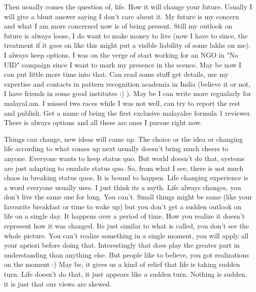 Then usually comes the question of, life. How it will change your future. Usually I will give a 
blunt answer saying I don't care about it. My future is my concern and what I am more concerned now 
is of being present. Still my outlook on future is always loose, I do want to make money to live (now 
I have to since, the treatment if it goes on like this might put a visible liability of some lakhs 
on me). I always keep options, I was on the verge of start working for an NGO in "No UID" campaign 
since I want to mark my presence in the scence. May be now I can put little more time into that. Can 
read some stuff get details, use my expertise and contacts in pattern recognition academia in India
(believe it or not, I have friends in some good institutes :) ). May be I can write more regualarly 
for malayal.am. I missed two races while I was not well, can try to report the rest and publish. 
Get a name of being the first exclusive malayalee formula 1 reviewer. There is always options and 
all these are ones I pursue right now. 

Things can change, new ideas will come up. The choice or the idea or changing life according to 
what comes up next usually doesn't bring much cheers to anyone. Everyone wants to keep status quo. 
But world doesn't do that, systems are just adapting to emulate status quo. So, from what I see, 
there is not much chaos in breaking status quos. It is bound to happen. Life changing experience is 
a word everyone usually uses. I just think its a myth. Life always changes, you don't live the same 
one for long. You can't. Small things might be same (like your favourite breakfast or time to wake up) 
but you don't get a sudden outlook on life on a single day. It happens over a period of time. How you
realize it doesn't represent how it was changed. Its just similar to what is called, you don't see 
the whole picture. You can't realize something in a single moment, you will apply all your apriori 
before doing that. Interestingly that does play the greater part in understanding than anything 
else. But people like to believe, you got realizations on the moment :) May be, it gives us a kind 
of relief that life is taking sudden turn. Life doesn't do that, it just appears like a sudden turn. 
Nothing is sudden, it is just that our views are skewed.

\newpage 
